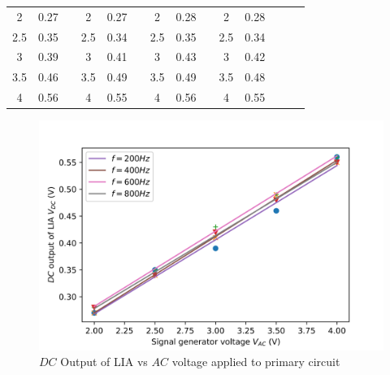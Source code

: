 \documentclass[%
 reprint,
nofootinbib,
 amsmath,amssymb,
 aps,
]{revtex4-2}
\begin{document}
\begin{table}[]
\begin{tabular}{cccccccccccccc}
            2 & 0.27 && 
            2 & 0.27 && 
            2 & 0.28 &&
            2 & 0.28  \\
            2.5 & 0.35 && 
            2.5 & 0.34 && 
            2.5 & 0.35 && 
            2.5 & 0.34 \\
            3 & 0.39 && 
            3 & 0.41 && 
            3 & 0.43 && 
            3 & 0.42 \\
            3.5 & 0.46 && 
            3.5 & 0.49 && 
            3.5 & 0.49 && 
            3.5 & 0.48 \\
            4 & 0.56 && 
            4 & 0.55 && 
            4 & 0.56 &&
            4 & 0.55  \\
            \bottomrule
            \end{tabular}
            \end{table}
            \begin{figure}
                \centering
                \includegraphics[scale = 0.56]{Figures/plot-lowresbox.png}
                \caption{$DC$ Output of LIA vs $AC$ voltage applied to primary circuit}
                \label{fig:lowresplot}
            \end{figure}
\end{document}
